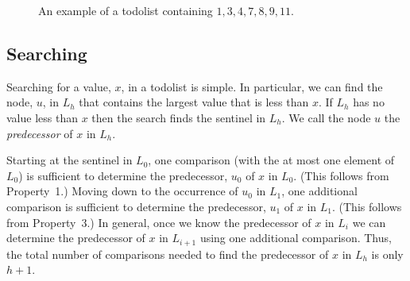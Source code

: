 \documentclass{patmorin}
\begin{document}
\begin{figure}
  \caption{An example of a todolist containing $1,3,4,7,8,9,11$.}
\end{figure}




\subsection{Searching}

Searching for a value, $x$, in a todolist is simple. In particular, we
can find the node, $u$, in $L_h$ that contains the largest value that
is less than $x$. If $L_h$ has no value less than $x$ then the search
finds the sentinel in $L_h$.  We call the node $u$ the \emph{predecessor}
of $x$ in $L_h$.

Starting at the sentinel in $L_0$, one comparison (with the at most one
element of $L_0$) is sufficient to determine the predecessor, $u_0$ of $x$
in $L_0$. (This follows from Property~1.)  Moving down to the occurrence
of $u_0$ in $L_1$, one additional comparison is sufficient to determine
the predecessor, $u_1$ of $x$ in $L_1$. (This follows from Property~3.)
In general, once we know the predecessor of $x$ in $L_i$ we can determine
the predecessor of $x$ in $L_{i+1}$ using one additional comparison. Thus,
the total number of comparisons needed to find the predecessor of $x$
in $L_h$ is only $h+1$.
\end{document}

